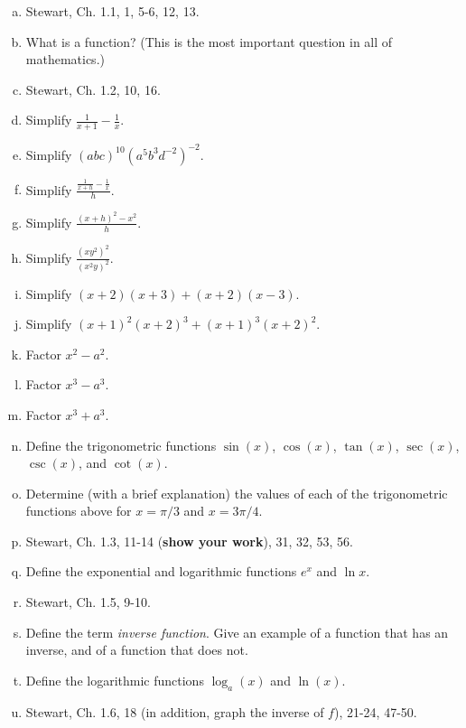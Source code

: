 \documentclass[12pt]{article}
\begin{document}
\begin{enumerate}[(a)]
\item 
Stewart, Ch. 1.1, 1, 5-6, 12, 13.

\item
What is a function? (This is the most important question in all of mathematics.)

\item
Stewart, Ch. 1.2, 10, 16.

\item
Simplify $\frac{1}{x + 1} - \frac{1}{x}$.

\item
Simplify $(abc)^{10} (a^5 b^3 d^{-2})^{-2}$.

\item
Simplify $\frac{ \frac{1}{x + h} - \frac{1}{x}}{h}$.

\item
Simplify $\frac{(x + h)^2 - x^2}{h}$.

\item
Simplify $\frac{(xy^2)^2}{(x^2y)^2}$.

\item
Simplify $(x + 2)(x + 3) + (x + 2)(x - 3)$.

\item
Simplify $(x + 1)^2 (x + 2)^3 + (x + 1)^3 (x + 2)^2$.

\item
Factor $x^2 - a^2$.

\item
Factor $x^3 - a^3$.

\item
Factor $x^3 + a^3$.

\item
Define the trigonometric 
functions $\sin(x)$, $\cos(x)$, $\tan(x)$, $\sec(x)$, $\csc(x)$,
and $\cot(x)$.

\item
Determine (with a brief explanation) the values of each of the trigonometric functions above for $x = \pi/3$ and $x = 3 \pi/4$.

\item
Stewart, Ch. 1.3, 11-14 ({\bf show your work}), 31, 32, 53, 56.

\item
Define the exponential and logarithmic functions $e^x$ and $\ln x$. 

\item
Stewart, Ch. 1.5, 9-10.

\item
Define the term {\itshape inverse function}. Give an example of a function that has an inverse,
and of a function that does not.

\item
Define the logarithmic functions $\log_a(x)$ and $\ln(x)$.

\item
Stewart, Ch. 1.6, 18 (in addition, graph the inverse of $f$), 21-24, 47-50.

\end{enumerate}
\end{document}
